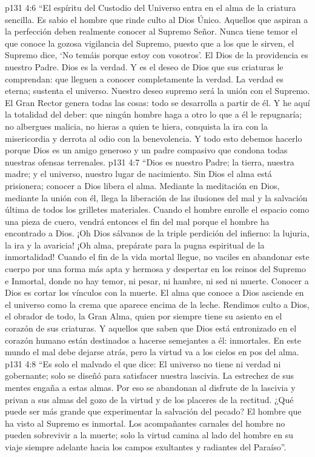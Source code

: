 \vs p131 4:6 “El espíritu del Custodio del Universo entra en el alma de la criatura sencilla. Es sabio el hombre que rinde culto al Dios Único. Aquellos que aspiran a la perfección deben realmente conocer al Supremo Señor. Nunca tiene temor el que conoce la gozosa vigilancia del Supremo, puesto que a los que le sirven, el Supremo dice, ‘No temáis porque estoy con vosotros'. El Dios de la providencia es nuestro Padre. Dios es la verdad. Y es el deseo de Dios que sus criaturas le comprendan: que lleguen a conocer completamente la verdad. La verdad es eterna; sustenta el universo. Nuestro deseo supremo será la unión con el Supremo. El Gran Rector genera todas las cosas: todo se desarrolla a partir de él. Y he aquí la totalidad del deber: que ningún hombre haga a otro lo que a él le repugnaría; no albergues malicia, no hieras a quien te hiera, conquista la ira con la misericordia y derrota al odio con la benevolencia. Y todo esto debemos hacerlo porque Dios es un amigo generoso y un padre compasivo que condona todas nuestras ofensas terrenales.
\vs p131 4:7 “Dios es nuestro Padre; la tierra, nuestra madre; y el universo, nuestro lugar de nacimiento. Sin Dios el alma está prisionera; conocer a Dios libera el alma. Mediante la meditación en Dios, mediante la unión con él, llega la liberación de las ilusiones del mal y la salvación última de todos los grilletes materiales. Cuando el hombre enrolle el espacio como una pieza de cuero, vendrá entonces el fin del mal porque el hombre ha encontrado a Dios. ¡Oh Dios sálvanos de la triple perdición del infierno: la lujuria, la ira y la avaricia! ¡Oh alma, prepárate para la pugna espiritual de la inmortalidad! Cuando el fin de la vida mortal llegue, no vaciles en abandonar este cuerpo por una forma más apta y hermosa y despertar en los reinos del Supremo e Inmortal, donde no hay temor, ni pesar, ni hambre, ni sed ni muerte. Conocer a Dios es cortar los vínculos con la muerte. El alma que conoce a Dios asciende en el universo como la crema que aparece encima de la leche. Rendimos culto a Dios, el obrador de todo, la Gran Alma, quien por siempre tiene su asiento en el corazón de sus criaturas. Y aquellos que saben que Dios está entronizado en el corazón humano están destinados a hacerse semejantes a él: inmortales. En este mundo el mal debe dejarse atrás, pero la virtud va a los cielos en pos del alma.
\vs p131 4:8 “Es solo el malvado el que dice: El universo no tiene ni verdad ni gobernante; solo se diseñó para satisfacer nuestra lascivia. La estrechez de sus mentes engaña a estas almas. Por eso se abandonan al disfrute de la lascivia y privan a sus almas del gozo de la virtud y de los placeres de la rectitud. ¿Qué puede ser más grande que experimentar la salvación del pecado? El hombre que ha visto al Supremo es inmortal. Los acompañantes carnales del hombre no pueden sobrevivir a la muerte; solo la virtud camina al lado del hombre en su viaje siempre adelante hacia los campos exultantes y radiantes del Paraíso”.
